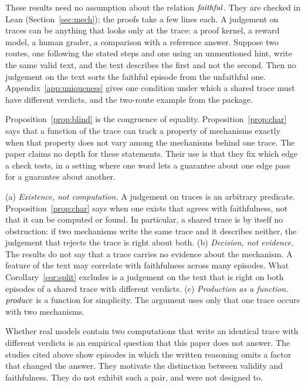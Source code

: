 \noindent
These results need no assumption about the relation $\mathit{faithful}$. They are checked in
Lean (Section~\ref{sec:mech}); the proofs take a few lines each. A judgement on traces
can be anything that looks only at the trace: a proof kernel, a reward model, a human
grader, a comparison with a reference answer. Suppose two routes, one following the
stated steps and one using an unmentioned hint, write the same valid text, and the text
describes the first and not the second. Then no judgement on the text sorts the
faithful episode from the unfaithful one. Appendix~\ref{app:uniqueness} gives one
condition under which a shared trace must have different verdicts, and the two-route
example from the package.

\begin{remark}
Proposition~\ref{prop:blind} is the congruence of equality.
Proposition~\ref{prop:char} says that a function of the trace can track a property of
mechanisms exactly when that property does not vary among the mechanisms behind one
trace. The paper claims no depth for these statements. Their use is that they fix which
edge a check tests, in a setting where one word lets a guarantee about one edge pass for
a guarantee about another.
\end{remark}

\begin{remark}[Scope]
\label{rem:scope}
(a) \emph{Existence, not computation.} A judgement on traces is an arbitrary predicate.
Proposition~\ref{prop:char} says when one exists that agrees with faithfulness, not
that it can be computed or found. In particular, a shared trace is by itself no
obstruction: if two mechanisms write the same trace and it describes neither, the
judgement that rejects the trace is right about both.
(b) \emph{Decision, not evidence.} The results do not say that a trace carries no
evidence about the mechanism. A feature of the text may correlate with faithfulness
across many episodes. What Corollary~\ref{cor:split} excludes is a judgement on the
text that is right on both episodes of a shared trace with different verdicts.
(c) \emph{Production as a function.} $\mathit{produce}$ is a function for simplicity. The
argument uses only that one trace occurs with two mechanisms.
\end{remark}

Whether real models contain two computations that write an identical trace with
different verdicts is an empirical question that this paper does not answer. The
studies cited above show episodes in which the written reasoning omits a factor that
changed the answer. They motivate the distinction between validity and faithfulness.
They do not exhibit such a pair, and were not designed to.

